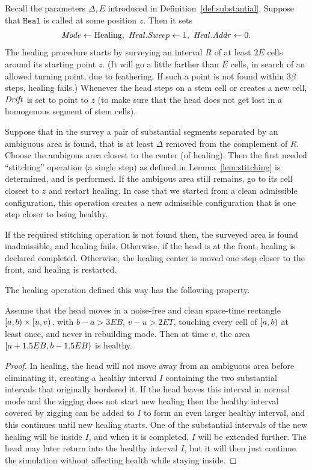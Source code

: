 \documentclass[11pt]{memoir}
\theoremstyle{definition} %
\newcommand{\fld}[1]{\ensuremath{\textit{#1\/}}}
\newcommand{\rul}[1]{\ensuremath{\texttt{#1}}}
\def\B{B}
\newcommand{\E}{E}
\newcommand{\R}{R}
\newcommand{\Tu}{T}
\newcommand{\z}{z}
\newcommand{\Addr}{\fld{Addr}}
\newcommand{\Drift}{\fld{Drift}}
\newcommand{\Mode}{\fld{Mode}}
\newcommand{\Heal}{\fld{Heal}}
\newcommand{\rHeal}{\rul{Heal}}
\newcommand{\Sweep}{\fld{Sweep}}
\newcommand{\Healing}{\mathrm{Healing}}
\begin{document}
Recall the parameters \( \Delta,\E \) introduced in Definition~\ref{def:substantial}.
Suppose that \( \rHeal \) is called at some position \( \z \).
Then it sets
\begin{align*}
\Mode\gets\Healing,\ \Heal.\Sweep \gets 1,\ \Heal.\Addr \gets 0.
 \end{align*} 
The healing procedure starts by surveying an interval \( \R \) of at least \( 2\E \) cells 
around its starting point \( z \).
(It will go a little farther than \( \E \) cells, in search of an allowed turning point, due to feathering.
If such a point is not found within \( 3\beta \) steps, healing fails.)
Whenever the head steps on a stem cell or creates a new cell, 
\( \Drift \) is set to point to \( \z \) (to make sure that the head does not get
lost in a homogenous segment of stem cells).

Suppose that in the survey a pair of substantial segments separated by an ambiguous area is found,
that is at least \( \Delta \) removed from the complement of \( R \). 
Choose the ambigous area closest to the center (of healing).
Then the first needed ``stitching'' operation (a single step) as defined in Lemma~\ref{lem:stitching}
is determined, and is performed.
If the ambigous area still remains, go to its cell closest to \( z \) and restart healing.
In case that we started from a clean admissible configuration, this operation creates a new admissible
configuration that is one step closer to being healthy.

If the required stitching operation is not found then, 
the surveyed area is found inadmissible, and healing fails.
Otherwise, if the head is at the front, healing is declared completed.
Otherwise, the healing center is moved one step closer to the front, and healing is restarted.

The healing operation defined this way has the following property.

\begin{lemma}\label{lem:combined-heals}
  Assume that the head moves in a noise-free and clean space-time rectangle \( \left[a,b\right)\times \left[u,v\right) \),
with \( b-a>3\E\B \), \( v-u>2\E\Tu \),
touching every cell of \( \left[a,b\right) \) at least once, and never in rebuilding mode.
Then at time \( v \), the area \( \lint{a+1.5\E\B}{b-1.5\E\B} \) is healthy.
\end{lemma}
\begin{proof}
In healing, the head will not move away from an ambiguous area before eliminating it, creating a healthy interval
\( I \) containing the two substantial intervals that originally bordered it.
If the head leaves this interval in normal mode and the zigging does not start new healing then the
healthy interval covered by zigging can be added to \( I \) to form an even larger healthy interval,
and this continues until new healing starts.
One of the substantial intervals of the new healing will be inside \( I \), and when it is completed,
\( I \) will be extended further.
The head may later return into the healthy interval \( I \), but it will then just continue the simulation without
affecting health while staying inside.  
\end{proof}
\end{document}
